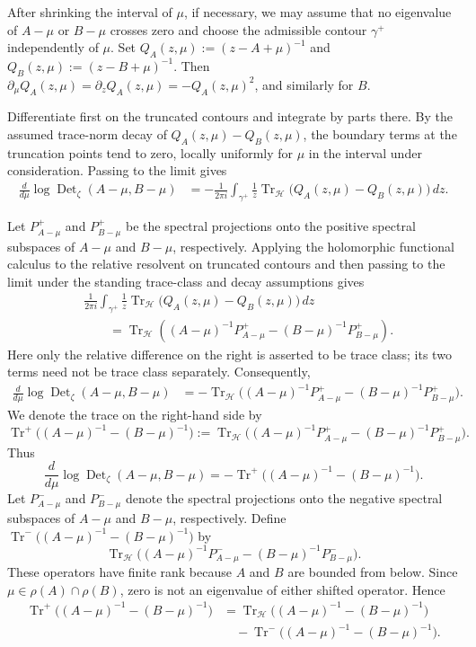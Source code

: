 \documentclass[12pt]{amsart}
\theoremstyle{plain}
\theoremstyle{definition}
\theoremstyle{remark}
\numberwithin{equation}{section} \numberwithin{figure}{section}
\begin{document}
After shrinking the interval of \(\mu\), if necessary, we may
assume that no eigenvalue of \(A-\mu\) or \(B-\mu\) crosses zero
and choose the admissible contour \(\gamma^+\) independently of
\(\mu\). Set
\(Q_A(z,\mu):=(z-A+\mu)^{-1}\) and
\(Q_B(z,\mu):=(z-B+\mu)^{-1}\).
Then
\(\partial_\mu Q_A(z,\mu)
=\partial_zQ_A(z,\mu)=-Q_A(z,\mu)^2\), and similarly for \(B\).

Differentiate first on the truncated contours and integrate by parts
there. By the assumed trace-norm decay of
\(Q_A(z,\mu)-Q_B(z,\mu)\), the boundary terms at the truncation
points tend to zero, locally uniformly for \(\mu\) in the interval
under consideration. Passing to the limit gives
\[
\begin{aligned}
\frac{d}{d\mu}
\log\operatorname{Det}_{\zeta}(A-\mu,B-\mu)
&=
-\frac{1}{2\pi i}
\int_{\gamma^+}
\frac{1}{z}
\operatorname{Tr}_{\mathcal H}\bigl(
Q_A(z,\mu)-Q_B(z,\mu)
\bigr)\,dz.
\end{aligned}
\]

Let \(P_{A-\mu}^+\) and \(P_{B-\mu}^+\) be the spectral projections
onto the positive spectral subspaces of \(A-\mu\) and \(B-\mu\),
respectively. Applying the holomorphic functional calculus to the
relative resolvent on truncated contours and then passing to the limit
under the standing trace-class and decay assumptions gives
\[
\begin{aligned}
&\frac{1}{2\pi i}
\int_{\gamma^+}
\frac{1}{z}
\operatorname{Tr}_{\mathcal H}\bigl(
Q_A(z,\mu)-Q_B(z,\mu)
\bigr)\,dz \\
&\qquad=
\operatorname{Tr}_{\mathcal H}\left(
(A-\mu)^{-1}P_{A-\mu}^+
-
(B-\mu)^{-1}P_{B-\mu}^+
\right).
\end{aligned}
\]
Here only the relative difference on the right is asserted to be trace
class; its two terms need not be trace class separately. Consequently,
\[
\begin{aligned}
\frac{d}{d\mu}
\log\operatorname{Det}_{\zeta}(A-\mu,B-\mu)
&=
-\operatorname{Tr}_{\mathcal H}\bigl(
(A-\mu)^{-1}P_{A-\mu}^+
-
(B-\mu)^{-1}P_{B-\mu}^+
\bigr).
\end{aligned}
\]
We denote the trace on the right-hand side by
\[
\operatorname{Tr}^+\bigl(
(A-\mu)^{-1}-(B-\mu)^{-1}
\bigr)
:=
\operatorname{Tr}_{\mathcal H}\bigl(
(A-\mu)^{-1}P_{A-\mu}^+
-
(B-\mu)^{-1}P_{B-\mu}^+
\bigr).
\]
Thus
\[
\frac{d}{d\mu}
\log\operatorname{Det}_{\zeta}(A-\mu,B-\mu)
=
-\operatorname{Tr}^+\bigl(
(A-\mu)^{-1}-(B-\mu)^{-1}
\bigr).
\]
Let \(P_{A-\mu}^-\) and \(P_{B-\mu}^-\) denote the spectral
projections onto the negative spectral subspaces of \(A-\mu\) and
\(B-\mu\), respectively. Define
\(\operatorname{Tr}^-\bigl((A-\mu)^{-1}-(B-\mu)^{-1}\bigr)\) by
\[
\operatorname{Tr}_{\mathcal H}\bigl(
(A-\mu)^{-1}P_{A-\mu}^-
-
(B-\mu)^{-1}P_{B-\mu}^-
\bigr).
\]
These operators have finite rank because \(A\) and \(B\) are
bounded from below. Since \(\mu\in\rho(A)\cap\rho(B)\), zero is not
an eigenvalue of either shifted operator. Hence
\[
\begin{aligned}
\operatorname{Tr}^+\bigl(
(A-\mu)^{-1}-(B-\mu)^{-1}
\bigr)
&=
\operatorname{Tr}_{\mathcal H}\bigl(
(A-\mu)^{-1}-(B-\mu)^{-1}
\bigr) \\
&\quad-
\operatorname{Tr}^-\bigl(
(A-\mu)^{-1}-(B-\mu)^{-1}
\bigr).
\end{aligned}
\]
\end{document}
